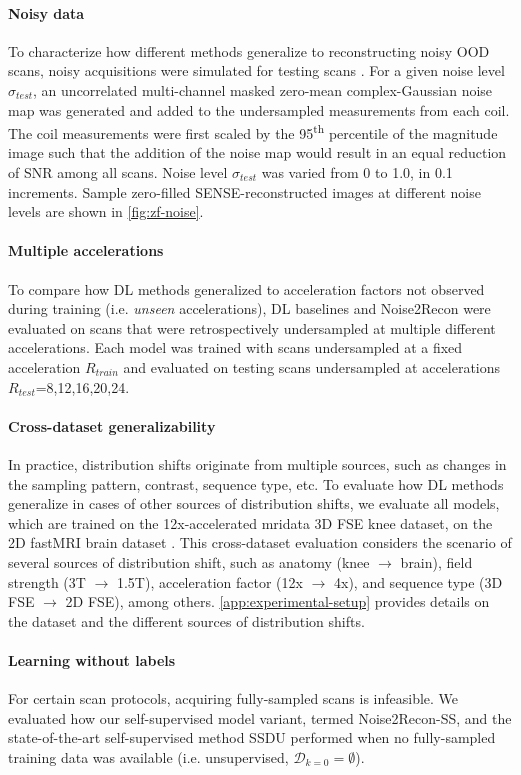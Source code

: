 \documentclass[10pt,twocolumn,letterpaper]{article}
\newcommand{\testnoise}{\sigma_{test}}
\newcommand{\RV}[1]{{#1}}
\begin{document}
\paragraph{Noisy data} To characterize how different methods generalize to reconstructing noisy OOD scans, noisy acquisitions were simulated for testing scans . For a given noise level $\testnoise$, an uncorrelated multi-channel masked zero-mean complex-Gaussian noise map was generated and added to the undersampled measurements from each coil. The coil measurements were first scaled by the 95\textsuperscript{th} percentile of the magnitude image such that the addition of the noise map would result in an equal reduction of SNR among all scans. Noise level $\testnoise$ was varied from 0 to 1.0, in 0.1 increments. Sample zero-filled SENSE-reconstructed images at different noise levels are shown in \cref{fig:zf-noise}.

\paragraph{Multiple accelerations} To compare how DL methods generalized to acceleration factors not observed during training (i.e. \textit{unseen} accelerations), DL baselines and Noise2Recon were evaluated on scans that were retrospectively undersampled at multiple different accelerations. Each model was trained with scans undersampled at a fixed acceleration $R_{train}$ and evaluated on testing scans undersampled at accelerations $R_{test}$=8,12,16,20,24.

\RV{
\paragraph{Cross-dataset generalizability}
In practice, distribution shifts originate from multiple sources, such as changes in the sampling pattern, contrast, sequence type, etc. To evaluate how DL methods generalize in cases of other sources of distribution shifts, we evaluate all models, which are trained on the 12x-accelerated mridata 3D FSE knee dataset, on the 2D fastMRI brain dataset \cite{zbontar2018fastmri}. This cross-dataset evaluation considers the scenario of several sources of distribution shift, such as anatomy (knee $\rightarrow$ brain), field strength (3T $\rightarrow$ 1.5T), acceleration factor (12x $\rightarrow$ 4x), and sequence type (3D FSE $\rightarrow$ 2D FSE), among others. \cref{app:experimental-setup} provides details on the dataset and the different sources of distribution shifts.

\paragraph{Learning without labels} For certain scan protocols, acquiring fully-sampled scans is infeasible. We evaluated how our self-supervised model variant, termed Noise2Recon-SS, and the state-of-the-art self-supervised method SSDU performed when no fully-sampled training data was available (i.e. unsupervised, $\mathcal{D}_{k=0} = \emptyset$).
}
\end{document}
